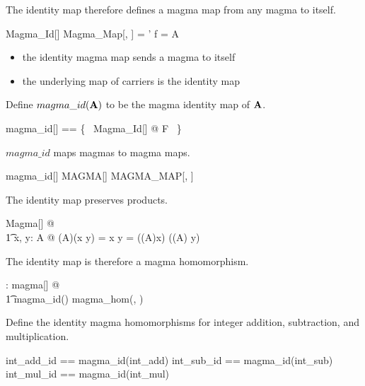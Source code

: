 \documentclass{amsart}
\begin{document}
The identity map therefore defines a magma map from any magma to itself.

\begin{schema}{Magma\_Id}[\genT]
	Magma\_Map[\genT, \genT]
\where
	\strucA = \strucA'
\also
	f = \id A
\end{schema}

\begin{itemize}
	\item the identity magma map sends a magma to itself
	\item the underlying map of carriers is the identity map
\end{itemize}

Define $magma\_id(\mathbf{A})$ to be the magma identity map of $\mathbf{A}$.

\begin{zed}
	magma\_id[\genT] == \{~ Magma\_Id[\genT] @ \strucA \mapsto F  ~\} 
\end{zed}

\begin{remark}
$magma\_id$ maps magmas to magma maps.
\begin{zed}
	magma\_id[\setT] \in MAGMA[\setT] \pfun MAGMA\_MAP[\setT, \setT]
\end{zed}

\end{remark}

\begin{remark}
The identity map preserves products.

\begin{zed}
	\forall Magma[\setT] @ \\
	\t1	\forall x, y: A @ (\id A)(x \opG y) = x \opG y = ((\id A)x) \opG ((\id A) y)
\end{zed}

\end{remark}

\begin{remark}
The identity map is therefore a magma homomorphism.

\begin{zed}
	\forall \strucA: magma[\setT] @ \\
	\t1	magma\_id(\strucA) \in magma\_hom(\strucA, \strucA)
\end{zed}

\end{remark}

\begin{example}
Define the identity magma homomorphisms for integer addition, subtraction, and multiplication.

\begin{zed}
	int\_add\_id == magma\_id(int\_add)
\also
	int\_sub\_id == magma\_id(int\_sub)
\also
	int\_mul\_id == magma\_id(int\_mul)
\end{zed}

\end{example}
\end{document}
